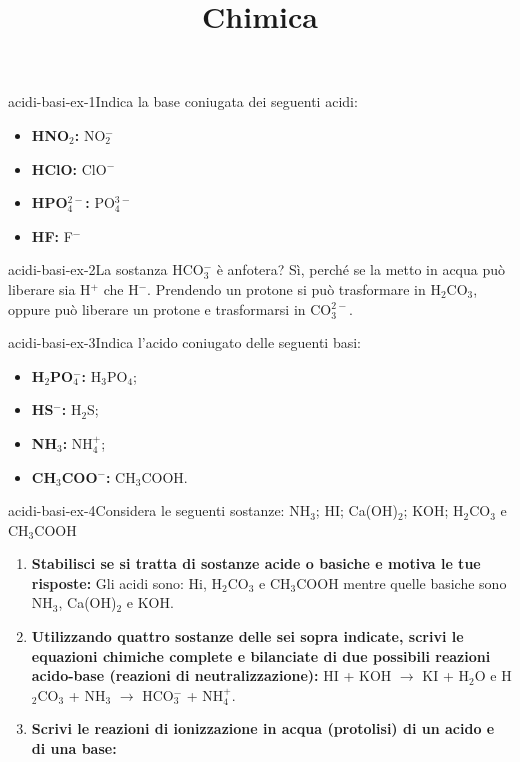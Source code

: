 \documentclass[preview]{standalone}
\begin{document}
\title{Chimica}
\genpage

\begin{snippetexercise}{acidi-basi-ex-1}{Indica la base coniugata dei seguenti acidi:}
    \begin{itemize}
        \item \textbf{HNO\(_2\):} NO\({}_2^-\)
        \item \textbf{HClO:} ClO\({}^-\)
        \item \textbf{HPO\(_4^{2-}\):} PO\({}_4^{3-}\)
        \item \textbf{HF:} F\(^-\)
    \end{itemize}
\end{snippetexercise}

\begin{snippetexercise}{acidi-basi-ex-2}{La sostanza HCO\(_3^-\) è anfotera?}
    Sì, perché se la metto in acqua può liberare sia H\({}^+\) che H\({}^-\).
    Prendendo un protone si può trasformare in H\({}_2\)CO\({}_3\),
    oppure può liberare un protone e trasformarsi in CO\({}_3^{2-}\).
\end{snippetexercise}


\begin{snippetexercise}{acidi-basi-ex-3}{Indica l'acido coniugato delle seguenti basi:}
    \begin{itemize}
        \item \textbf{H\({}_2\)PO\({}_4^-\):} H\(_3\)PO\(_4\);
        \item \textbf{HS\({}^-\):} H\(_2\)S;
        \item \textbf{NH\({}_3\):} NH\(_4^+\);
        \item \textbf{CH\({}_3\)COO\({}^-\):} CH\(_3\)COOH.
    \end{itemize}
\end{snippetexercise}

\begin{snippetexercise}{acidi-basi-ex-4}{Considera le seguenti sostanze:
    NH\(_3\); HI; Ca(OH)\({}_2\); KOH; H\({}_2\)CO\({}_3\) e CH\({}_3\)COOH}
    \begin{enumerate}
        \item \textbf{Stabilisci se si tratta di sostanze acide o basiche e motiva le tue risposte:}
            Gli acidi sono: Hi, H\({}_2\)CO\({}_3\) e CH\({}_3\)COOH
            mentre quelle basiche sono NH\(_3\), Ca(OH)\({}_2\) e KOH.
        \item \textbf{Utilizzando quattro sostanze delle sei sopra indicate, scrivi le equazioni chimiche
        complete e bilanciate di due possibili reazioni acido-base (reazioni di
        neutralizzazione):}
        HI + KOH \(\rightarrow\) KI + H\({}_2\)O
        e
        H\({}_2\)CO\({}_3\) + NH\({}_3\) \(\rightarrow\) HCO\({}_3^-\) + NH\({}_4^+\).
        \item \textbf{Scrivi le reazioni di ionizzazione in acqua (protolisi) di un acido e di una base:}

    \end{enumerate}
\end{snippetexercise}
\end{document}
